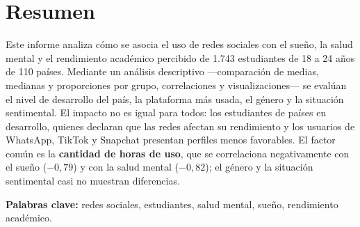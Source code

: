 \section*{Resumen}

Este informe analiza cómo se asocia el uso de redes sociales con el sueño, la salud mental y el rendimiento
académico percibido de 1.743 estudiantes de 18 a 24 años de 110 países. Mediante un análisis descriptivo
—comparación de medias, medianas y proporciones por grupo, correlaciones y visualizaciones— se evalúan el
nivel de desarrollo del país, la plataforma más usada, el género y la situación sentimental. El impacto no es
igual para todos: los estudiantes de países en desarrollo, quienes declaran que las redes afectan su
rendimiento y los usuarios de WhatsApp, TikTok y Snapchat presentan perfiles menos favorables. El factor
común es la \textbf{cantidad de horas de uso}, que se correlaciona negativamente con el sueño ($-0{,}79$) y
con la salud mental ($-0{,}82$); el género y la situación sentimental casi no muestran diferencias.

\noindent\textbf{Palabras clave:} redes sociales, estudiantes, salud mental, sueño, rendimiento académico.
